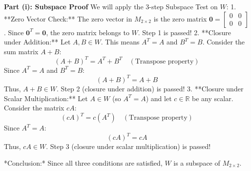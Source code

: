 \documentclass[11pt,a4paper]{article}
\begin{document}
\begin{solutionbox}
\textbf{Part (i): Subspace Proof}
We will apply the 3-step Subspace Test on $W$:
1. **Zero Vector Check:**
   The zero vector in $M_{2\times 2}$ is the zero matrix $\mathbf{0} = \begin{bmatrix} 0 & 0 \\ 0 & 0 \end{bmatrix}$.
   Since $\mathbf{0}^T = \mathbf{0}$, the zero matrix belongs to $W$. Step 1 is passed!
2. **Closure under Addition:**
   Let $A, B \in W$. This means $A^T = A$ and $B^T = B$.
   Consider the sum matrix $A+B$:
   \[ (A + B)^T = A^T + B^T \quad (\text{Transpose property}) \]
   Since $A^T = A$ and $B^T = B$:
   \[ (A + B)^T = A + B \]
   Thus, $A+B \in W$. Step 2 (closure under addition) is passed!
3. **Closure under Scalar Multiplication:**
   Let $A \in W$ (so $A^T = A$) and let $c \in \mathbb{R}$ be any scalar.
   Consider the matrix $c A$:
   \[ (c A)^T = c (A^T) \quad (\text{Transpose property}) \]
   Since $A^T = A$:
   \[ (c A)^T = c A \]
   Thus, $c A \in W$. Step 3 (closure under scalar multiplication) is passed!
   
*Conclusion:* Since all three conditions are satisfied, $W$ is a subspace of $M_{2 \times 2}$.


\end{solutionbox}
\end{document}

